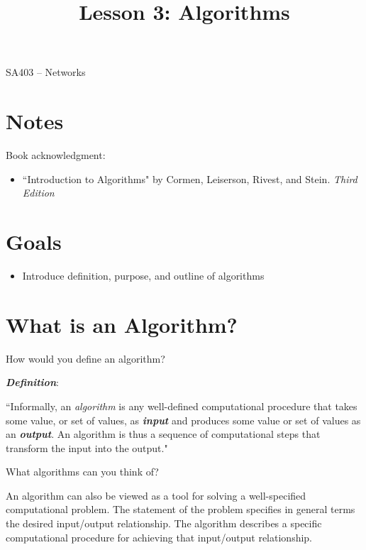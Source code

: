 \documentclass[12pt]{article}
\makeatletter
\theoremstyle{definition}
\newcommand{\graphbox}[5]%
{
\begin{tikzpicture}
     [>=latex,scale=#5]
     
     \draw [->,very thick] (#1, 0) -- (#2, 0) node[right] {$x$};
     \draw [->,very thick] (0, #3) -- (0, #4) node[above] {$y$};
     
     \draw[step=1cm,thick,dotted] (#1,#3) grid (#2,#4);
   \end{tikzpicture}
   }
\renewcommand{\maketitle}{
  \noindent SA403 -- Networks \\

  \begin{center}\Large{\textbf{\@title}}\end{center}
}
\makeatother
\begin{document}

\title{Lesson 3: Algorithms}


\maketitle


\section*{Notes}

Book acknowledgment:
\begin{itemize}
	\item[]  ``Introduction to Algorithms" by Cormen, Leiserson, Rivest, and Stein. \emph{Third Edition}
\end{itemize}
\section*{Goals}
\begin{itemize}
\item Introduce definition, purpose, and outline of algorithms
\end{itemize}


\section{What is an Algorithm?}

How would you define an algorithm?

\vskip 4cm


\textbf{\emph{Definition}}:

``Informally, an \emph{algorithm} is any well-defined computational procedure that takes some value, or set of values, as \textbf{\emph{input}} and produces some value or set of values as an \textbf{\emph{output}}. An algorithm is thus a sequence of computational steps that transform the input into the output."

\vskip 0.5cm

What algorithms can you think of? 

\vskip 4cm

\newpage

An algorithm can also be viewed as a tool for solving a well-specified computational problem. The statement of the problem specifies in general terms the desired input/output relationship. The algorithm describes a specific computational procedure for achieving that input/output relationship.
\end{document}
